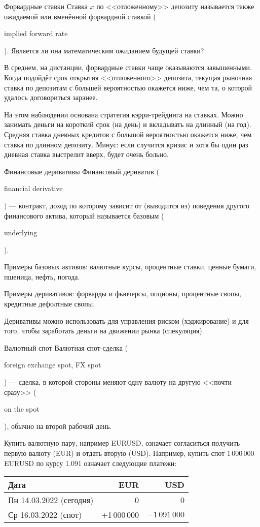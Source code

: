 \documentclass{beamer}
\newcommand{\en}[1]{\begin{otherlanguage}{english}#1\end{otherlanguage}}
\begin{document}
\begin{frame}{Форвардные ставки}
\justify 
Ставка $x$ по <<отложенному>> депозиту называется также \alert{ожидаемой или вменённой форвардной ставкой} (\en{implied forward rate}). Является ли она математическим ожиданием будущей ставки?

\justify
В среднем, на дистанции, форвардные ставки чаще оказываются завышенными. Когда подойдёт срок открытия <<отложенного>> депозита, текущая рыночная ставка по депозитам с большей вероятностью окажется ниже, чем та, о которой удалось договориться заранее. 

\justify
На этом наблюдении основана стратегия кэрри-трейдинга на ставках. Можно занимать деньги на короткий срок (на день) и вкладывать на длинный (на год). Средняя ставка дневных кредитов с большой вероятностью окажется ниже, чем ставка по длинном депозиту. Минус: если случится кризис и хотя бы один раз дневная ставка выстрелит вверх, будет очень больно.
\end{frame}



\begin{frame}{Финансовые деривативы}
\justify
\alert{Финансовый дериватив} (\en{financial derivative}) --- контракт, доход по которому зависит 
от (выводится из) поведения другого финансового актива, который называется базовым 
(\en{underlying}).

\justify
Примеры базовых активов: валютные курсы, процентные ставки, ценные бумаги, пшеница, нефть, погода.

\justify
Примеры деривативов: форварды и фьючерсы, опционы, процентные свопы, кредитные дефолтные свопы.

\justify
Деривативы можно использовать для управления риском (хэджирование) и для того, чтобы заработать деньги на движении рынка (спекуляция). 
\end{frame}



\begin{frame}{Валютный спот}
\justify
\alert{Валютная спот-сделка} (\en{foreign exchange spot, FX spot}) --- сделка, в которой стороны меняют одну валюту на другую <<почти сразу>> (\en{on the spot}), обычно на второй рабочий день.

\justify
Купить валютную пару, например EURUSD, означает согласиться получить первую валюту (EUR) и отдать вторую (USD). Например, купить спот 1\,000\,000 EURUSD по курсу 1.091 означает следующие платежи:

\justify
\centering
\begin{tabular}{l|r|r}
Дата                          & EUR & USD \\ \hline
Пн 14.03.2022 (сегодня)  & 0   & 0   \\
Ср 16.03.2022 (спот)     & +1\,000\,000 & $-1\,091\,000$
\end{tabular}
\end{frame}
\end{document}
